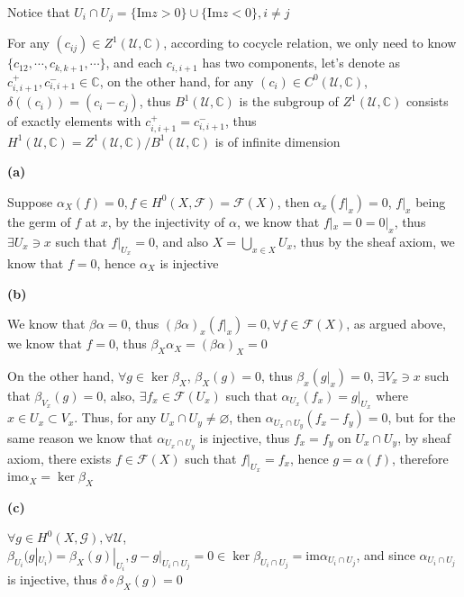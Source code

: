 \documentclass[../main.tex]{subfiles}
\begin{document}
\begin{problem}
Notice that $U_{i}\cap U_{j}=\{\mathrm{Im}z>0\}\cup\{\mathrm{Im}z<0\}, i\neq j$ \par
For any $(c_{ij})\in Z^{1}(\mathcal{U},\mathbb{C})$, according to cocycle relation, we only need to know $\{c_{12},\cdots,c_{k,k+1},\cdots\}$, and each $c_{i,i+1}$ has two components, let's denote as $c_{i,i+1}^{+},c_{i,i+1}^{-}\in \mathbb{C}$, on the other hand, for any $(c_{i})\in C^{0}(\mathcal{U},\mathbb{C})$, $\delta\left((c_{i})\right)=(c_{i}-c_{j})$, thus $B^{1}(\mathcal{U},\mathbb{C})$ is the subgroup of $Z^{1}(\mathcal{U},\mathbb{C})$ consists of exactly elements with $c_{i,i+1}^{+}=c_{i,i+1}^{-}$, thus $H^{1}(\mathcal{U},\mathbb{C})=Z^{1}(\mathcal{U},\mathbb{C})/B^{1}(\mathcal{U},\mathbb{C})$ is of infinite dimension
\end{problem}

\begin{problem}
\textbf{(a)} \par
Suppose $\alpha_{X}(f)=0, f\in H^{0}(X,\mathcal{F})=\mathcal{F}(X)$, then $\alpha_{x}(f|_{x})=0$, $f|_{x}$ being the germ of $f$ at $x$, by the injectivity of $\alpha$, we know that $f|_{x}=0=0|_{x}$, thus $\exists U_{x} \ni x$ such that $f|_{U_{x}}=0$, and also $X=\bigcup_{x\in X} U_{x}$, thus by the sheaf axiom, we know that $f=0$, hence $\alpha_{X}$ is injective \par
\textbf{(b)} \par
We know that $\beta\alpha=0$, thus $\left(\beta\alpha\right)_{x}(f|_{x})=0, \forall f\in \mathcal{F}(X)$, as argued above, we know that $f=0$, thus $\beta_{X}\alpha_{X}=\left(\beta\alpha\right)_{X}=0$ \par
On the other hand, $\forall g\in \ker\beta_{X}$, $\beta_{X}(g)=0$, thus $\beta_{x}(g|_{x})=0$, $\exists V_{x}\ni x$ such that $\beta_{V_{x}}(g)=0$, also, $\exists f_{x}\in \mathcal{F}(U_{x})$ such that $\alpha_{U_{x}}(f_{x})=g|_{U_{x}}$ where $x\in U_{x}\subset V_{x}$. Thus, for any $U_{x}\cap U_{y}\neq \varnothing$, then $\alpha_{U_{x}\cap U_{y}}(f_{x}-f_{y})=0$, but for the same reason we know that $\alpha_{U_{x}\cap U_{y}}$ is injective, thus $f_{x}=f_{y}$ on $U_{x}\cap U_{y}$, by sheaf axiom, there exists $f\in \mathcal{F}(X)$ such that $f|_{U_{x}}=f_{x}$, hence $g=\alpha(f)$, therefore $\mathrm{im}\alpha_{X}=\ker\beta_{X}$ \par
\textbf{(c)} \par
$\forall g\in H^{0}(X,\mathcal{G}), \forall \mathcal{U}$, $\beta_{U_{i}}(g|_{U_{i}})=\beta_{X}(g)|_{U_{i}},g-g|_{U_{i}\cap U_{j}}=0\in \ker\beta_{U_{i}\cap U_{j}}=\mathrm{im}\alpha_{U_{i}\cap U_{j}}$, and since $\alpha_{U_{i}\cap U_{j}}$ is injective, thus $\delta\circ\beta_{X}(g)=0$ \par

\end{problem}
\end{document}
